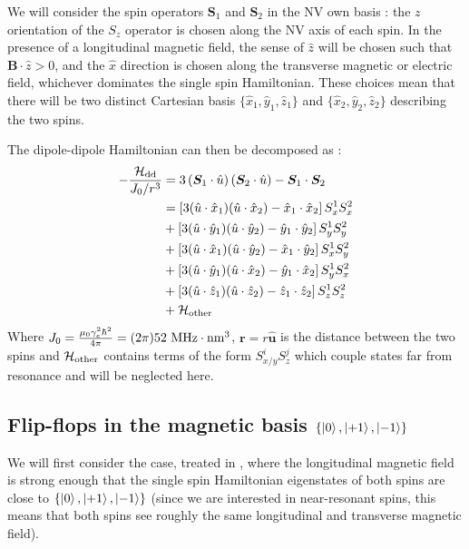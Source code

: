 \documentclass[preprintnumbers,amsmath,amssymb,onecolumn,12pt]{revtex4-2}\usepackage{graphicx}%
\begin{document}
We will consider the spin operators $\bm{S}_1$ and
$\bm{S}_2$ in the NV own basis : the $z$ orientation of the $S_z$ operator is chosen along the NV axis of each spin. In the presence of a longitudinal magnetic field, the sense of $\hat{z}$ will be chosen such that $\bm{B}\cdot \hat{z} >0$, and the $\hat{x}$ direction is chosen along the transverse magnetic or electric field, whichever dominates the single spin Hamiltonian. These choices mean that there will be two distinct Cartesian basis $\{\hat{x}_1,\hat{y}_1,\hat{z}_1\}$ and $\{\hat{x}_2,\hat{y}_2,\hat{z}_2\}$ describing the two spins.

The dipole-dipole Hamiltonian can then be decomposed as :
\begin{align}
-\frac{\mathcal{H}_{\rm dd}}{J_0/r^3}&= 3\left({\bm S}_1 \cdot \hat{u} \right)\left({\bm S}_2 \cdot \hat{u} \right) - {\bm S}_1 \cdot {\bm S}_2  \\
&=\left[3(\hat{u}\cdot\hat{x}_1)(\hat{u}\cdot\hat{x}_2) -\hat{x}_1\cdot\hat{x}_2\right] S_x^1S_x^2 \\
&+\left[3(\hat{u}\cdot\hat{y}_1)(\hat{u}\cdot\hat{y}_2) -\hat{y}_1\cdot\hat{y}_2\right] S_y^1S_y^2 \\
&+\left[3(\hat{u}\cdot\hat{x}_1)(\hat{u}\cdot\hat{y}_2) -\hat{x}_1\cdot\hat{y}_2\right] S_x^1S_y^2 \\
&+\left[3(\hat{u}\cdot\hat{y}_1)(\hat{u}\cdot\hat{x}_2) -\hat{y}_1\cdot\hat{x}_2\right] S_y^1S_x^2 \\
&+\left[3(\hat{u}\cdot\hat{z}_1)(\hat{u}\cdot\hat{z}_2) -\hat{z}_1\cdot\hat{z}_2\right] S_z^1S_z^2 \\
&+\mathcal{H}_{\rm other}
\end{align}
Where $J_0=\frac{\mu_0 \gamma_e^2 \hbar^2}{4 \pi} = (2 \pi) 52\ \rm MHz \cdot \rm{nm}^3$, $\bm r= r\bm{\hat u}$ is the distance between the two spins and  $\mathcal{H}_{\rm other}$ contains terms of the form $S_{x/y}^iS_z^j$ which couple states far from resonance and will be neglected here.

\subsection{Flip-flops in the magnetic basis $\{ \ket{0},\ket{+1},\ket{-1} \} $}
We will first consider the case, treated in \cite{choi_depolarization_2017}, where the longitudinal magnetic field is strong enough that the single spin Hamiltonian eigenstates of both spins are close to $\{ \ket{0},\ket{+1},\ket{-1} \} $ (since we are interested in near-resonant spins, this means that both spins see roughly the same longitudinal and transverse magnetic field).
\end{document}
